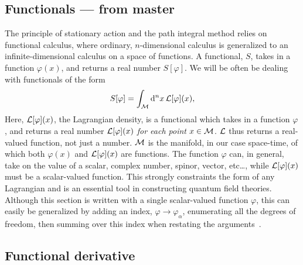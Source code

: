 \subsection{Functionals --- from master}
\label{appendix: Functional derivatives}


The principle of stationary action and the path integral method relies on functional calculus, where ordinary, $n$-dimensional calculus is generalized to an infinite-dimensional calculus on a space of functions.
A functional, $S$, takes in a function $\varphi(x)$, and returns a real number $S[\varphi]$.
We will be often be dealing with functionals of the form
%
\begin{equation}
    \label{general action functional}
    S[\varphi] = \int_\mathcal M \mathrm{d}^n x \, \mathcal L[\varphi](x),
\end{equation}
%
Here, $\mathcal L[\varphi](x)$, the Lagrangian density, is a functional which takes in a function $\varphi$, and returns a real number $\mathcal L[\varphi](x)$ \emph{for each point} $x \in \mathcal M$.
$\mathcal L$ thus returns a real-valued function, not just a number.
$\mathcal M$ is the manifold, in our case space-time, of which both $\varphi(x)$ and $\mathcal L[\varphi](x)$ are functions.
The function $\varphi$ can, in general, take on the value of a scalar, complex number, spinor, vector, etc\dots, while $\mathcal L[\varphi](x)$ must be a scalar-valued function.
This strongly constraints the form of any Lagrangian and is an essential tool in constructing quantum field theories.
Although this section is written with a single scalar-valued function $\varphi$, this can easily be generalized by adding an index, $\varphi \rightarrow \varphi_\alpha$, enumerating all the degrees of freedom, then summing over this index when restating the arguments~\autocite{carrollSpacetimeGeometryIntroduction2019,schwartzQuantumFieldTheory2013,peskinIntroductionQuantumField1995}.



\subsection{Functional derivative}

